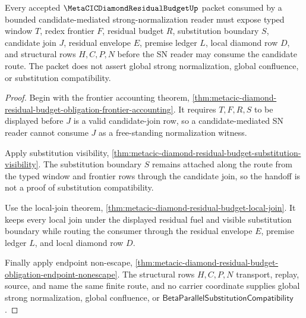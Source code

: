 \begin{theorem}
\label{thm:metacic-diamond-residual-budget-candidate-sn-handoff}
Every accepted $\MetaCICDiamondResidualBudgetUp$ packet consumed by a bounded candidate-mediated strong-normalization reader must expose typed window $T$, redex frontier $F$, residual budget $R$, substitution boundary $S$, candidate join $J$, residual envelope $E$, premise ledger $L$, local diamond row $D$, and structural rows $H,C,P,N$ before the SN reader may consume the candidate route. The packet does not assert global strong normalization, global confluence, or substitution compatibility.
\end{theorem}
\begin{proof}
Begin with the frontier accounting theorem, \autoref{thm:metacic-diamond-residual-budget-obligation-frontier-accounting}. It requires $T,F,R,S$ to be displayed before $J$ is a valid candidate-join row, so a candidate-mediated SN reader cannot consume $J$ as a free-standing normalization witness.

Apply substitution visibility, \autoref{thm:metacic-diamond-residual-budget-substitution-visibility}. The substitution boundary $S$ remains attached along the route from the typed window and frontier rows through the candidate join, so the handoff is not a proof of substitution compatibility.

Use the local-join theorem, \autoref{thm:metacic-diamond-residual-budget-local-join}. It keeps every local join under the displayed residual fuel and visible substitution boundary while routing the consumer through the residual envelope $E$, premise ledger $L$, and local diamond row $D$.

Finally apply endpoint non-escape, \autoref{thm:metacic-diamond-residual-budget-obligation-endpoint-nonescape}. The structural rows $H,C,P,N$ transport, replay, source, and name the same finite route, and no carrier coordinate supplies global strong normalization, global confluence, or $\mathsf{BetaParallelSubstitutionCompatibility}$.
\end{proof}

